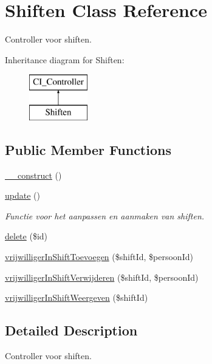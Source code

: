 \hypertarget{class_shiften}{}\section{Shiften Class Reference}
\label{class_shiften}


Controller voor shiften.  


Inheritance diagram for Shiften\+:\begin{figure}[H]
\begin{center}
\leavevmode
\includegraphics[height=2.000000cm]{class_shiften}
\end{center}
\end{figure}
\subsection*{Public Member Functions}
\begin{DoxyCompactItemize}
\item 
\mbox{\hyperlink{class_shiften_ab8a8594268fd644b65cbc27698fd94f4}{\+\_\+\+\_\+construct}} ()
\item 
\mbox{\hyperlink{class_shiften_af783a05fca5d9fe438122482ce10ded8}{update}} ()
\begin{DoxyCompactList}\small\item\em Functie voor het aanpassen en aanmaken van shiften. \end{DoxyCompactList}\item 
\mbox{\hyperlink{class_shiften_a68ff1255b0af39c545eae586c3fac0b8}{delete}} (\$id)
\item 
\mbox{\hyperlink{class_shiften_a68ed5c1cd7c018cd80ceb6bc940afa7f}{vrijwilliger\+In\+Shift\+Toevoegen}} (\$shift\+Id, \$persoon\+Id)
\item 
\mbox{\hyperlink{class_shiften_a67201ed9a01bf5fe153c6c8d2a60e9ad}{vrijwilliger\+In\+Shift\+Verwijderen}} (\$shift\+Id, \$persoon\+Id)
\item 
\mbox{\hyperlink{class_shiften_a9919cdc243d1281466d02e8b5d102e69}{vrijwilliger\+In\+Shift\+Weergeven}} (\$shift\+Id)
\end{DoxyCompactItemize}


\subsection{Detailed Description}
Controller voor shiften. 


